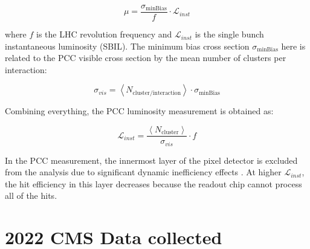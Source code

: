 \begin{equation}
\mu = \frac{\sigma_{\text{minBias}}}{f} \cdot \mathcal{L}_{inst}
\end{equation}

where $f$ is the LHC revolution frequency and $\mathcal{L}_{inst}$ is the single bunch instantaneous luminosity (SBIL). The minimum bias cross section $\sigma_{\text{minBias}}$ here is related to the PCC visible cross section by the mean number of clusters per interaction:

\begin{equation}
\sigma_{vis}= \left < N_{\text{cluster}/\text{interaction}} \right >\cdot \sigma_{\text{minBias}}
\end{equation}

Combining everything, the PCC luminosity measurement is obtained as:

\begin{equation}
\mathcal{L}_{inst}=\frac{\left < N_{\text{cluster}} \right >}{\sigma_{vis}} \cdot f
\end{equation}



In the PCC measurement, the innermost layer of the pixel detector is excluded from the analysis due to significant dynamic inefficiency effects \cite{pas_18}. At higher $\mathcal{L}_{inst}$, the hit efficiency in this layer decreases because the readout chip cannot process all of the hits.\\ 

\section{2022 CMS Data collected}

